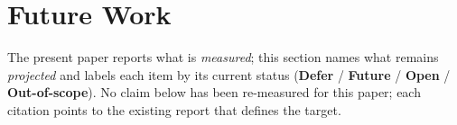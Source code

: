 
\section{Future Work}
\label{sec:future}

The present paper reports what is \emph{measured}; this section names
what remains \emph{projected} and labels each item by its current
status (\textbf{Defer} / \textbf{Future} / \textbf{Open} /
\textbf{Out-of-scope}).  No claim below has been re-measured for this
paper; each citation points to the existing report that defines the
target.

